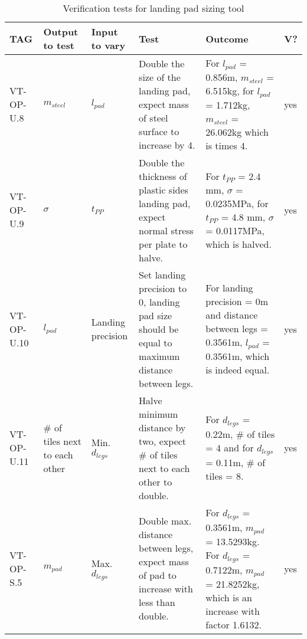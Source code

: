 \begin{longtable}[h]{|p{1.25cm}|p{1.25cm}|p{1.25cm}|p{5cm}|p{5cm}|p{0.5cm}|}
\caption{Verification tests for landing pad sizing tool}
\label{tab:unitverifpad}\\
\hline
\textbf{TAG} & \textbf{Output to test} & \textbf{Input to vary} & \textbf{Test}                                                                                  & \textbf{Outcome}                                                                                                                                 & \textbf{V?}                 \\ \hline
\endfirsthead
%
\endhead
%
VT-OP-U.8    & $m_{steel}$     & $l_{pad}$      & Double the size of the landing pad, expect mass of steel surface to increase by 4.             & For $l_{pad}$ = 0.856m, $m_{steel}$ = 6.515kg, for $l_{pad}$ = 1.712kg, $m_{steel}$ = 26.062kg which is times 4. & \cellcolor[HTML]{C1FFC1}yes \\ \hline
VT-OP-U.9    & $\sigma$                & $t_{PP}$               & Double the thickness of plastic sides landing pad, expect normal stress per plate to halve.    & For $t_{PP}$ = 2.4 mm, $\sigma$ = 0.0235MPa, for $t_{PP}$ = 4.8 mm, $\sigma$ = 0.0117MPa, which is halved.                                       & \cellcolor[HTML]{C1FFC1}yes \\ \hline
VT-OP-U.10   & $l_{pad}$       & Landing precision      & Set landing precision to 0, landing pad size should be equal to maximum distance between legs. & For landing precision = 0m and distance between legs = 0.3561m, $l_{pad}$ =  0.3561m, which is indeed equal.                             & \cellcolor[HTML]{C1FFC1}yes \\ \hline

VT-OP-U.11   & \# of tiles next to each other       & Min. $d_{legs}$     &  Halve minimum distance by two, expect \# of tiles next to each other to double. & For $d_{legs}$ = 0.22m, \# of tiles = 4 and for $d_{legs}$ = 0.11m, \# of tiles = 8.                           & \cellcolor[HTML]{C1FFC1}yes \\ \hline


VT-OP-S.5 & $m_{pad}$ & Max. $d_{legs}$ & Double max. distance between legs, expect mass of pad to increase with less than double. & For $d_{legs}$ = 0.3561m, $m_{pad}$ = 13.5293kg. For $d_{legs}$ = 0.7122m, $m_{pad}$ = 21.8252kg, which is an increase with factor 1.6132. & yes\cellcolor[HTML]{C1FFC1} \\ \hline
\end{longtable}


